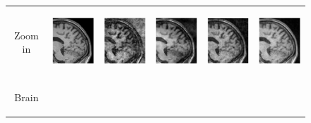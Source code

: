 \documentclass[10pt,journal,compsoc]{IEEEtran}
\begin{document}
\begin{figure}[ht]
\begin{raggedleft}
\begin{tabular}{cccccc}
			\tabularnewline
			
			\multirow{1}{0.05cm}[1.3cm]{\begin{turn}{90} {\footnotesize Zoom in} \end{turn}} &
			
			\includegraphics[width=2.5cm,height=2.5cm]{include/grp2/factor6/022-Guys-0701-T1/022-Guys-0701-T1_images__zoom_50} &
			\includegraphics[width=2.5cm,height=2.5cm]{include/grp2/factor6/022-Guys-0701-T1/022-Guys-0701-T1_images__zeroPadding_zoom_50} & 
			\includegraphics[width=2.5cm,height=2.5cm]{include/grp2/factor6/022-Guys-0701-T1/022-Guys-0701-T1_images__CS_zoom_50} & \includegraphics[width=2.5cm,height=2.5cm]{include/grp2/factor6/022-Guys-0701-T1/022-Guys-0701-T1_images__IMCNNL2TUNE_zoom_50} & \includegraphics[width=2.5cm,height=2.5cm]{include/grp2/factor6/022-Guys-0701-T1/022-Guys-0701-T1_images__predict_zoom_50}
			
			\tabularnewline
			
			\multirow{2}{0.05cm}[1.4cm]{\begin{turn}{90} {\footnotesize Brain} \end{turn}} & 
			

\end{tabular}
\end{raggedleft}
\end{figure}
\end{document}
